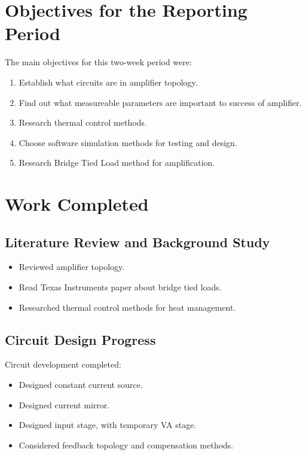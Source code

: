 \documentclass[11pt,a4paper]{article}
\begin{document}
	\section{Objectives for the Reporting Period}
	
	The main objectives for this two-week period were:
	\begin{enumerate}[label=\arabic*.]
		\item Establish what circuits are in amplifier topology.
		\item Find out what measureable parameters are important to success of amplifier.
		\item Research thermal control methods.
		\item Choose software simulation methods for testing and design.
		\item Research Bridge Tied Load method for amplification.
	\end{enumerate}
	
	\section{Work Completed}
	
	\subsection{Literature Review and Background Study}
	\begin{itemize}
		\item Reviewed amplifier topology.
		\item Read Texas Instruments paper about bridge tied loads.
		\item Researched thermal control methods for heat management.
	\end{itemize}
	
	\subsection{Circuit Design Progress}
	Circuit development completed:
	\begin{itemize}
		\item Designed constant current source.
		\item Designed current mirror.
		\item Designed input stage, with temporary VA stage.
		\item Considered feedback topology and compensation methods.
	\end{itemize}
	
\end{document}
